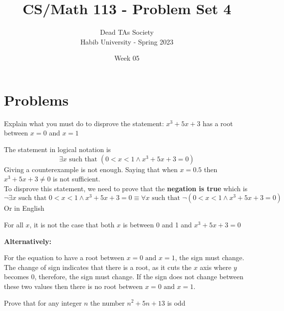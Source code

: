 \documentclass[addpoints]{exam}
\title{CS/Math 113 - Problem Set 4}
\author{Dead TAs Society \\ Habib University - Spring 2023}
\date{Week 05}
\newenvironment{problem}[2][Problem]{\begin{trivlist}
    \item[\hskip \labelsep {\bfseries #1}\hskip \labelsep {\bfseries #2.}]}{\end{trivlist}}
\begin{document}
\maketitle
\begin{sloppypar}
\section*{Problems}
    \begin{problem}{1}
    Explain what you must do to disprove the statement:
    $x^3+5x + 3$ has a root between $x = 0$ and $x=1$
    \end{problem}
    
    \begin{questions}
        \question
        \begin{solution}

            The statement in logical notation is 
            $$\exists x \text{ such that } (0<x<1 \land x^3+5x+3 = 0)$$
            Giving a counterexample is not enough. Saying that when $x=0.5$ then $x^3 +5x+3 \neq 0$ is not sufficient. \\
            To disprove this statement, we need to prove that the \textbf{negation is true} which is
            $$\neg \exists x \text{ such that } 0<x<1 \land x^3+5x+3 = 0 \equiv \forall x \text{ such that } \neg(0<x<1 \land x^3+5x+3 = 0)$$
            Or in English
            \begin{center}
                For all $x$, it is not the case that both $x$ is between 0 and 1 and $x^3+5x+3=0$
            \end{center}

            \textbf{Alternatively:}

            \vspace*{2mm}
            For the equation to have a root between $ x = 0 \text{ and } x = 1 $, the sign must change. The change of sign indicates that there is a root, as it cuts the $x$ axis where $y$ becomes 0, therefore, the sign must change. If the sign does not change between these two values then there is no root between $ x = 0 \text{ and } x = 1 $. %
        \end{solution}
    \end{questions}
    \pagebreak
    \begin{problem}{2}
    Prove that for any integer $n$ the number $n^2+5n+13$ is odd
    \end{problem}
    

\end{sloppypar}
\end{document}
